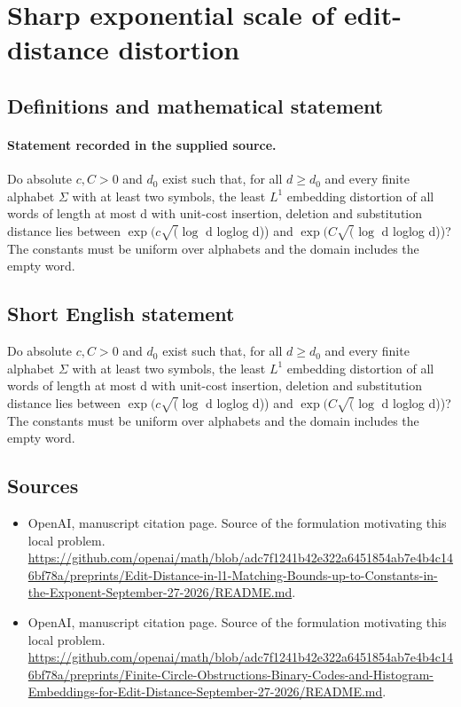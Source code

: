 \documentclass[11pt]{article}
\begin{document}
\section*{Sharp exponential scale of edit-distance distortion}\label{30007116}
\subsection{Definitions and mathematical statement}
\paragraph{Statement recorded in the supplied source.}
Do absolute $c,C>0$ and $d_{0}$ exist such that, for all $d\geq d_{0}$ and every finite alphabet $\Sigma $ with at least two symbols, the least $L^{1}$ embedding distortion of all words of length at most d with unit-cost insertion, deletion and substitution distance lies between $\exp (c\surd (\log $ d loglog d)) and $\exp (C\surd (\log $ d loglog d))? The constants must be uniform over alphabets and the domain includes the empty word.
\subsection{Short English statement}
Do absolute $c,C>0$ and $d_{0}$ exist such that, for all $d\geq d_{0}$ and every finite alphabet $\Sigma $ with at least two symbols, the least $L^{1}$ embedding distortion of all words of length at most d with unit-cost insertion, deletion and substitution distance lies between $\exp (c\surd (\log $ d loglog d)) and $\exp (C\surd (\log $ d loglog d))? The constants must be uniform over alphabets and the domain includes the empty word.
\subsection{Sources}
\begin{itemize}
\item[S1] OpenAI, manuscript citation page. Source of the formulation motivating this local problem.
\url{https://github.com/openai/math/blob/adc7f1241b42e322a6451854ab7e4b4c146bf78a/preprints/Edit-Distance-in-l1-Matching-Bounds-up-to-Constants-in-the-Exponent-September-27-2026/README.md}.
\item[S2] OpenAI, manuscript citation page. Source of the formulation motivating this local problem.
\url{https://github.com/openai/math/blob/adc7f1241b42e322a6451854ab7e4b4c146bf78a/preprints/Finite-Circle-Obstructions-Binary-Codes-and-Histogram-Embeddings-for-Edit-Distance-September-27-2026/README.md}.
\end{itemize}
\end{document}
